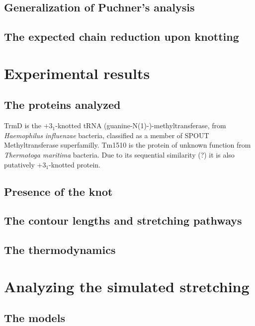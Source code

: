 \documentclass[11pt]{article}
\begin{document}
\subsection*{Generalization of Puchner's analysis}
\label{subsec:wlc_method}


\subsection*{The expected chain reduction upon knotting}
\label{subsec:wlc_chain-reduction}

\section*{Experimental results}
\label{sec:exp}

\subsection*{The proteins analyzed}
\label{subsec:exp_proteins}
TrmD is the $+3_1$-knotted tRNA (guanine-N(1)-)-methyltransferase, from \textit{Haemophilus influenzae} bacteria, classified as a member of SPOUT Methyltransferase superfamilly.
Tm1510 is the protein of unknown function from \textit{Thermotoga maritima} bacteria.
Due to its sequential similarity (?) it is also putatively $+3_1$-knotted protein.

\subsection*{Presence of the knot}
\label{subsec:exp_knot}

\subsection*{The contour lengths and stretching pathways}
\label{subsec:exp_contour-lengths}

\subsection*{The thermodynamics}
\label{subsec:exp_thermodynamics}

\section{Analyzing the simulated stretching}
\label{sec:theory}
\subsection*{The models}
\label{subsec:theory_models}
\end{document}
